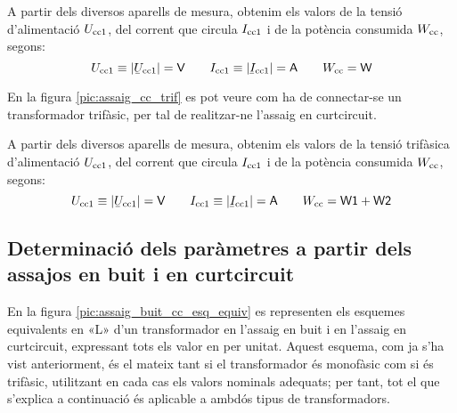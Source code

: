A partir dels diversos aparells de mesura, obtenim els valors de la
tensió d'alimentació $U_\mathrm{cc1}$, del corrent que circula
$I_\mathrm{cc1}$ i de la potència consumida $W_\mathrm{cc}$, segons:
\begin{equation}
    U\ped{cc1}\equiv|\cmplx{U}\ped{cc1}|=\textsf{V} \qquad
    I\ped{cc1}\equiv|\cmplx{I}\ped{cc1}|=\textsf{A}
     \qquad W\ped{cc}=\textsf{W}
\end{equation}

En la figura \vref{pic:assaig_cc_trif} es pot veure com ha de
connectar-se un transformador trifàsic, per tal de realitzar-ne l'assaig en curtcircuit.

\begin{center}
    
    \label{pic:assaig_cc_trif}
\end{center}


A partir dels diversos aparells de mesura, obtenim els valors de la
tensió trifàsica d'alimentació $U_\mathrm{cc1}$, del corrent que circula
$I_\mathrm{cc1}$ i de la potència consumida $W_\mathrm{cc}$, segons:
\begin{equation}
    U\ped{cc1}\equiv|\cmplx{U}\ped{cc1}|=\textsf{V} \qquad
    I\ped{cc1}\equiv|\cmplx{I}\ped{cc1}|=\textsf{A} \qquad
    W\ped{cc}=\textsf{W1}+\textsf{W2}
\end{equation}

\subsection{Determinació dels paràmetres a partir dels assajos en buit i en curtcircuit}

En la figura \vref{pic:assaig_buit_cc_esq_equiv}  es representen els
esquemes equivalents en «L» d'un transformador en l'assaig en buit i
en l'assaig en curtcircuit, expressant tots els valor en per unitat.
Aquest esquema, com ja s'ha vist anteriorment, és el mateix tant si
el transformador és monofàsic com si és trifàsic, utilitzant en cada
cas els valors nominals adequats; per tant, tot el que s'explica  a
continuació és aplicable a ambdós tipus de transformadors.

\begin{center}
    
     \label{pic:assaig_buit_cc_esq_equiv}
\end{center}

